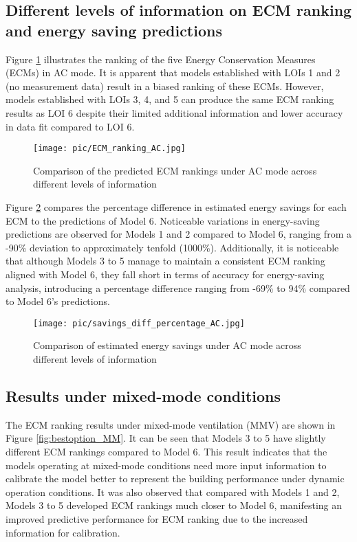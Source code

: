 \documentclass[3p,times,12pt]{elsarticle}
\begin{document}
\begin{sloppypar}
\subsection{Different levels of information on ECM ranking and energy saving predictions}
\label{S:3.2}

Figure \ref{fig:bestoption_AC} illustrates the ranking of the five Energy Conservation Measures (ECMs) in AC mode. It is apparent that models established with LOIs 1 and 2 (no measurement data) result in a biased ranking of these ECMs. However, models established with LOIs 3, 4, and 5 can produce the same ECM ranking results as LOI 6 despite their limited additional information and lower accuracy in data fit compared to LOI 6. 

\begin{figure}[H]
\centering\texttt{[image: pic/ECM\_ranking\_AC.jpg]}
\caption{Comparison of the predicted ECM rankings under AC mode across different levels of information}
\label{fig:bestoption_AC}
\end{figure}

Figure \ref{fig:savings_AC} compares the percentage difference in estimated energy savings for each ECM to the predictions of Model 6. Noticeable variations in energy-saving predictions are observed for Models 1 and 2 compared to Model 6, ranging from a -90\% deviation to approximately tenfold (1000\%). Additionally, it is noticeable that although Models 3 to 5 manage to maintain a consistent ECM ranking aligned with Model 6, they fall short in terms of accuracy for energy-saving analysis, introducing a percentage difference ranging from -69\% to 94\% compared to Model 6's predictions.

\begin{figure}[H]
\centering\texttt{[image: pic/savings\_diff\_percentage\_AC.jpg]}
\caption{Comparison of estimated energy savings under AC mode across different levels of information}
\label{fig:savings_AC}
\end{figure}


\subsection{Results under mixed-mode conditions}
\label{S:3.3}

The ECM ranking results under mixed-mode ventilation (MMV) are shown in Figure \ref{fig:bestoption_MM}. It can be seen that Models 3 to 5 have slightly different ECM rankings compared to Model 6. This result indicates that the models operating at mixed-mode conditions need more input information to calibrate the model better to represent the building performance under dynamic operation conditions. It was also observed that compared with Models 1 and 2, Models 3 to 5 developed ECM rankings much closer to Model 6, manifesting an improved predictive performance for ECM ranking due to the increased information for calibration.


\end{sloppypar}
\end{document}
